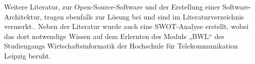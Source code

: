 Weitere Literatur, zur Open-Source-Software und der Erstellung einer Software-Architektur, tragen ebenfalls zur Lösung bei und sind im Literaturverzeichnis vermerkt..
Neben der Literatur wurde auch eine SWOT-Analyse erstellt, wobei das dort notwendige Wissen auf dem Erlernten des Moduls „BWL“ des Studiengangs Wirtschaftsinformatik der Hochschule für Telekommunikation Leipzig beruht.


